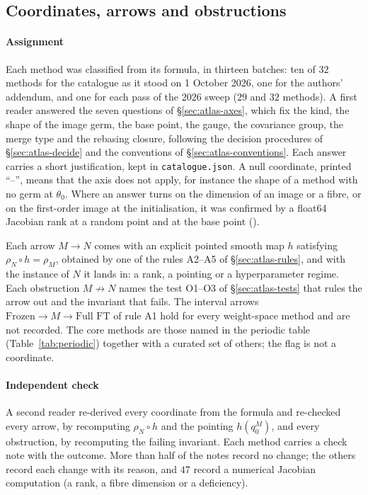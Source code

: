 \subsection{Coordinates, arrows and obstructions}\label{app:catalogue-classification}

\paragraph{Assignment}
Each method was classified from its formula, in thirteen batches: ten of $32$ methods for the catalogue as it stood
on 1 October 2026, one for the authors' addendum, and one for each pass of the 2026 sweep ($29$ and $32$ methods). A first reader answered the
seven questions of \S\ref{sec:atlas-axes}, which fix the kind, the shape of the image germ, the base point, the gauge,
the covariance group, the merge type and the rebasing closure, following the decision procedures of
\S\ref{sec:atlas-decide} and the conventions of \S\ref{sec:atlas-conventions}. Each answer carries a short
justification, kept in \texttt{catalogue.json}. A null coordinate, printed ``--'', means that the axis does not apply,
for instance the shape of a method with no germ at $\theta_0$. Where an answer turns on the dimension of an image or a
fibre, or on the first-order image at the initialisation, it was confirmed by a float64 Jacobian rank at a random point
and at the base point ().

Each arrow $M\to N$ comes with an explicit pointed smooth map $h$ satisfying $\rho_N\circ h=\rho_M$, obtained by one of
the rules A2--A5 of \S\ref{sec:atlas-rules}, and with the instance of $N$ it lands in: a rank, a pointing or a
hyperparameter regime. Each obstruction $M\not\to N$ names the test O1--O3 of \S\ref{sec:atlas-tests} that rules the
arrow out and the invariant that fails. The interval arrows $\text{Frozen}\to M\to\text{Full FT}$ of rule A1 hold for
every weight-space method and are not recorded. The \nCore{} core methods are those named in the periodic table
(Table~\ref{tab:periodic}) together with a curated set of others; the flag is not a coordinate.

\paragraph{Independent check}
A second reader re-derived every coordinate from the formula and re-checked every arrow, by recomputing
$\rho_N\circ h$ and the pointing $h(q_0^M)$, and every obstruction, by recomputing the failing invariant. Each method
carries a check note with the outcome. More than half of the notes record no change; the others record each change with
its reason, and $47$ record a numerical Jacobian computation (a rank, a fibre dimension or a deficiency).

